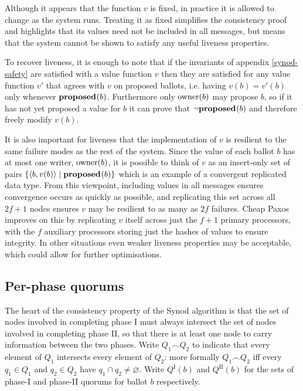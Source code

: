 \documentclass[journal]{IEEEtran}
\begin{document}
Although it appears that the function $v$ is fixed, in practice it is allowed
to change as the system runs. Treating it as fixed simplifies the consistency
proof and highlights that its values need not be included in all messages, but
means that the system cannot be shown to satisfy any useful liveness
properties.

To recover liveness, it is enough to note that if the invariants of appendix
\ref{synod-safety} are satisfied with a value function $v$ then they are
satisfied for any value function $v'$ that agrees with $v$ on proposed ballots,
i.e. having $v(b) = v'(b)$ only whenever $\mathbf{proposed}_{}(b)$.  Furthermore only
$\mathrm{owner}(b)$ may propose $b$, so if it has not yet proposed a value for $b$ it
can prove that $\neg\mathbf{proposed}_{}(b)$ and therefore freely modify $v(b)$.

It is also important for liveness that the implementation of $v$ is resilient
to the same failure modes as the rest of the system. Since the value of each
ballot $b$ has at most one writer, $\mathrm{owner}(b)$, it is possible to think of
$v$ as an insert-only set of pairs ${\{ \langle b, v(b) \rangle \mid \mathbf{proposed}_{}(b)
\}}$ which is an example of a convergent replicated data type\cite{crdts}.
From this viewpoint, including values in all messages ensures convergence
occurs as quickly as possible, and replicating this set across all ${2f+1}$
nodes ensures $v$ may be resilient to as many as $2f$ failures. Cheap Paxos
improves on this by replicating $v$ itself across just the ${f+1}$ primary
processors, with the $f$ auxiliary processors storing just the hashes of values
to ensure integrity.  In other situations even weaker liveness properties may
be acceptable, which could allow for further optimisations.

\subsection{Per-phase quorums}\label{per-phase-quorums}

\def\I#1#2{{#1}^\textrm{I}_{#2}}
\def\II#1#2{{#1}^\textrm{II}_{#2}}
\def\QI#1{\I{Q}{#1}}
\def\QII#1{\II{Q}{#1}}

The heart of the consistency property of the Synod algorithm is that the set of
nodes involved in completing phase I must always intersect the set of nodes
involved in completing phase II, so that there is at least one node to carry
information between the two phases. Write $Q_1 \frown Q_2$ to indicate that
every element of $Q_1$ intersects every element of $Q_2$: more formally $Q_1
\frown Q_2$ iff every $q_1 \in Q_1$ and $q_2 \in Q_2$ have ${q_1 \cap q_2 \ne
\varnothing}$. Write $\QI{}(b)$ and $\QII{}(b)$ for the sets of
phase-I and phase-II quorums for ballot $b$ respectively.
\end{document}
